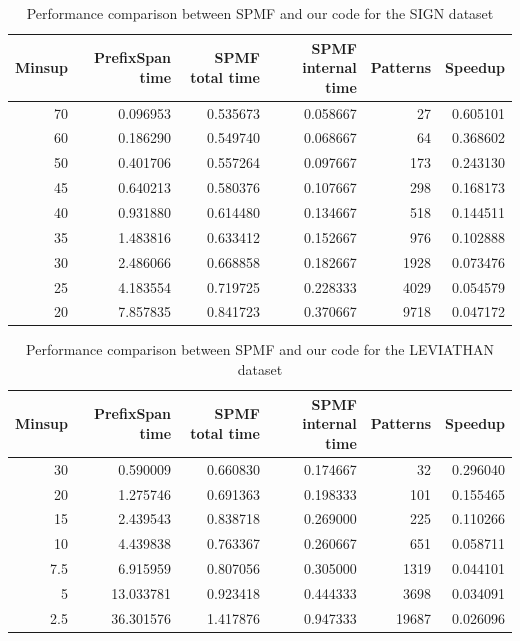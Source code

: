 \documentclass[11pt,a4paper]{article}
\begin{document}
\begin{table}[H]
	\centering
	\caption{Performance comparison between SPMF and our code for the SIGN dataset}
	\label{tab:performance-sign-spmf-code}
	\begin{tabular}{|r|r|r|r|r|r|}
		\hline
		\textbf{Minsup} & \textbf{PrefixSpan time} & \textbf{SPMF total time} & \textbf{SPMF internal time} & \textbf{Patterns} & \textbf{Speedup} \\ \hline
		70 & 0.096953 & 0.535673 & 0.058667 &   27 & 0.605101 \\
		60 & 0.186290 & 0.549740 & 0.068667 &   64 & 0.368602 \\
		50 & 0.401706 & 0.557264 & 0.097667 &  173 & 0.243130 \\
		45 & 0.640213 & 0.580376 & 0.107667 &  298 & 0.168173 \\
		40 & 0.931880 & 0.614480 & 0.134667 &  518 & 0.144511 \\
		35 & 1.483816 & 0.633412 & 0.152667 &  976 & 0.102888 \\
		30 & 2.486066 & 0.668858 & 0.182667 & 1928 & 0.073476 \\
		25 & 4.183554 & 0.719725 & 0.228333 & 4029 & 0.054579 \\
		20 & 7.857835 & 0.841723 & 0.370667 & 9718 & 0.047172 \\ \hline
	\end{tabular}
\end{table}

\begin{table}[H]
	\centering
	\caption{Performance comparison between SPMF and our code for the LEVIATHAN dataset}
	\label{tab:performance-leviathan-spmf-code}
	\begin{tabular}{|r|r|r|r|r|r|}
		\hline
		\textbf{Minsup} & \textbf{PrefixSpan time} & \textbf{SPMF total time} & \textbf{SPMF internal time} & \textbf{Patterns} & \textbf{Speedup} \\ \hline
		 30 &  0.590009 & 0.660830 & 0.174667 &    32 & 0.296040 \\
		 20 &  1.275746 & 0.691363 & 0.198333 &   101 & 0.155465 \\
		 15 &  2.439543 & 0.838718 & 0.269000 &   225 & 0.110266 \\
		 10 &  4.439838 & 0.763367 & 0.260667 &   651 & 0.058711 \\
		7.5 &  6.915959 & 0.807056 & 0.305000 &  1319 & 0.044101 \\
		  5 & 13.033781 & 0.923418 & 0.444333 &  3698 & 0.034091 \\
		2.5 & 36.301576 & 1.417876 & 0.947333 & 19687 & 0.026096 \\ \hline
	\end{tabular}
\end{table}
\end{document}
